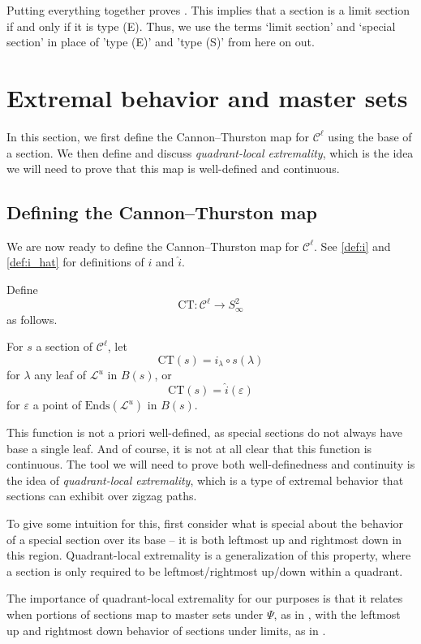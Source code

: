 \documentclass[11pt]{amsart}
\renewcommand{\l}{\lambda}
\newcommand{\mc}{\mathcal}
\newcommand{\wh}{\widehat}
\newcommand{\Ends}{\mathrm{Ends}}
\newcommand{\ct}{\mathrm{CT}}
\numberwithin{equation}{section}
\theoremstyle{definition}
\begin{document}
Putting everything together proves . This implies that a section is a limit section if and only if it is type (E). Thus, we use the terms `limit section' and `special section' in place of 'type (E)' and 'type (S)' from here on out.

\section{Extremal behavior and master sets}\label{sec:qle}
In this section, we first define the Cannon--Thurston map for $\mc C^\ell$ using the base of a section. We then define and discuss \emph{quadrant-local extremality}, which is the idea we will need to prove that this map is well-defined and continuous.

\subsection{Defining the Cannon--Thurston map}\label{sec:ct_def}
We are now ready to define the Cannon--Thurston map for $\mc C^\ell$. See \ref{def:i} and \ref{def:i_hat} for definitions of $i$ and $\wh i$.

\begin{definition}\label{def:ct}
	Define
	\[
	\ct\colon\mc C^\ell\to S^2_\infty
	\]
	as follows. 

For $s$ a section of $\mc C^\ell$, let
\[
\ct(s)=i_\l\circ s(\l)
\]
for $\l$ any leaf of $\mc L^u$ in $B(s)$, or
\[
\ct(s)=\wh i(\varepsilon)
\]
for $\varepsilon$ a point of $\Ends(\mc L^u)$ in $B(s)$.
\end{definition}

This function is not a priori well-defined, as special sections do not always have base a single leaf. And of course, it is not at all clear that this function is continuous. The tool we will need to prove both well-definedness and continuity is the idea of \emph{quadrant-local extremality}, which is a type of extremal behavior that sections can exhibit over zigzag paths.

To give some intuition for this, first consider what is special about the behavior of a special section over its base -- it is both leftmost up and rightmost down in this region. Quadrant-local extremality is a generalization of this property, where a section is only required to be leftmost/rightmost up/down within a quadrant.

The importance of quadrant-local extremality for our purposes is that it relates when portions of sections map to master sets under $\Psi$, as in , with the leftmost up and rightmost down behavior of sections under limits, as in . 
\end{document}
